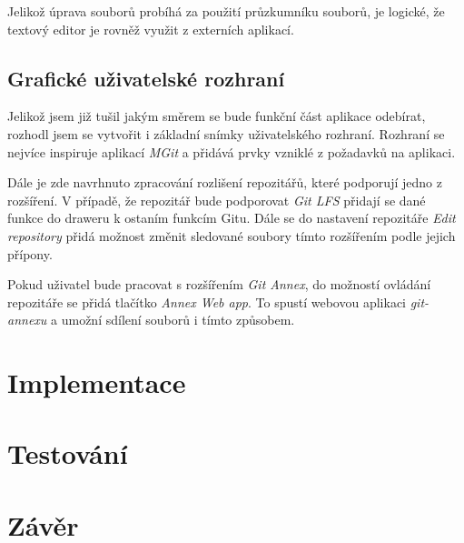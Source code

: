     Jelikož úprava souborů probíhá za použití průzkumníku souborů, je logické, že textový editor je rovněž využit z externích aplikací.

    \section{Grafické uživatelské rozhraní}
    Jelikož jsem již tušil jakým směrem se bude funkční část aplikace odebírat, rozhodl jsem se vytvořit i základní snímky uživatelského rozhraní. Rozhraní se nejvíce inspiruje aplikací \emph{MGit} a přidává prvky vzniklé z požadavků na aplikaci.

    Dále je zde navrhnuto zpracování rozlišení repozitářů, které podporují jedno z rozšíření. V případě, že repozitář bude podporovat \emph{Git LFS} přidají se dané funkce do draweru k ostaním funkcím Gitu. Dále se do nastavení repozitáře \emph{Edit repository} přidá možnost změnit sledované soubory tímto rozšířením podle jejich přípony.

    Pokud uživatel bude pracovat s rozšířením \emph{Git Annex}, do možností ovládání repozitáře se přidá tlačítko \emph{Annex Web app}. To spustí webovou aplikaci \emph{git-annexu} a umožní sdílení souborů i tímto způsobem.

\chapter{Implementace}

\chapter{Testování}
\chapter{Závěr}